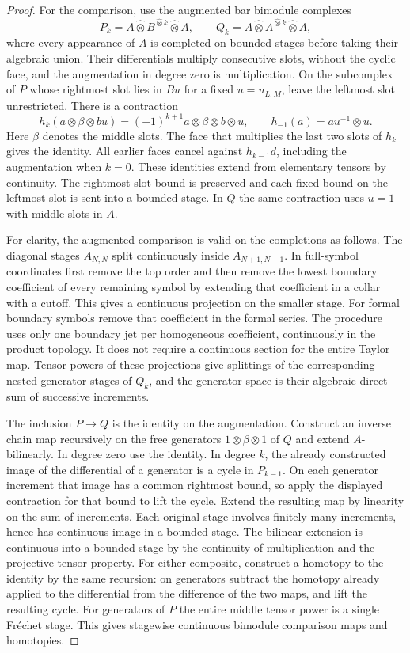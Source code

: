 \documentclass[11pt,oneside,reqno]{article}
\theoremstyle{plain}
\theoremstyle{definition}
\theoremstyle{remark}
\begin{document}
\begin{proof}
For the comparison, use the augmented bar bimodule complexes
\[
 P_k=A\widehat\otimes B^{\widehat\otimes k}\widehat\otimes A,
 \qquad
 Q_k=A\widehat\otimes A^{\widehat\otimes k}\widehat\otimes A,
\]
where every appearance of \(A\) is completed on bounded stages
before taking their algebraic union. Their differentials multiply
consecutive slots, without the cyclic face, and the augmentation in
degree zero is multiplication. On the subcomplex of \(P\) whose
rightmost slot lies in \(Bu\) for a fixed \(u=u_{L,M}\), leave the
leftmost slot unrestricted. There is a contraction
\[
 h_k(a\otimes\beta\otimes b u)
   =(-1)^{k+1}a\otimes\beta\otimes b\otimes u,
 \qquad h_{-1}(a)=a u^{-1}\otimes u.
\]
Here \(\beta\) denotes the middle slots. The face that multiplies the
last two slots of \(h_k\) gives the identity. All earlier faces
cancel against \(h_{k-1}d\), including the augmentation when \(k=0\).
These identities extend from elementary tensors by continuity. The
rightmost-slot bound is preserved and each fixed bound on the
leftmost slot is sent into a bounded stage. In \(Q\) the same
contraction uses \(u=1\) with middle slots in \(A\).

For clarity, the augmented comparison is valid on the completions as
follows. The diagonal stages \(A_{N,N}\) split continuously inside
\(A_{N+1,N+1}\). In full-symbol coordinates first remove the top
order and then remove the lowest boundary coefficient of every
remaining symbol by extending that coefficient in a collar with a
cutoff. This gives a continuous projection on the smaller stage.
For formal boundary symbols remove that coefficient in the formal
series. The procedure uses only one boundary jet per homogeneous
coefficient, continuously in the product topology. It does not
require a continuous section for the entire Taylor map. Tensor
powers of these projections give splittings of the corresponding
nested generator stages of \(Q_k\), and the generator space is
their algebraic direct sum of successive increments.

The inclusion \(P\to Q\) is the identity on the augmentation.
Construct an inverse chain map recursively on the free generators
\(1\otimes\beta\otimes1\) of \(Q\) and extend \(A\)-bilinearly.
In degree zero use the identity. In degree \(k\), the already
constructed image of the differential of a generator is a cycle
in \(P_{k-1}\). On each generator increment that image has a common
rightmost bound, so apply the displayed contraction for that bound
to lift the cycle. Extend the resulting map by linearity on the
sum of increments. Each original stage involves finitely many
increments, hence has continuous image in a bounded stage. The
bilinear extension is continuous into a bounded stage by the
continuity of multiplication and the projective tensor property.
For either composite, construct a homotopy to the identity by the
same recursion: on generators subtract the homotopy already
applied to the differential from the difference of the two maps,
and lift the resulting cycle. For generators of \(P\) the entire
middle tensor power is a single Fr\'echet stage. This gives
stagewise continuous bimodule comparison maps and homotopies.


\end{proof}
\end{document}
